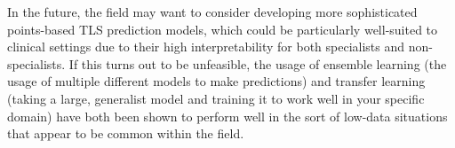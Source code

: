 \documentclass{article}
\begin{document}
In the future, the field may want to consider developing more sophisticated points-based TLS prediction models, which could be particularly well-suited to clinical settings due to their high interpretability for both specialists and non-specialists. If this turns out to be unfeasible, the usage of ensemble learning (the usage of multiple different models to make predictions) and transfer learning (taking a large, generalist model and training it to work well in your specific domain) have both been shown to perform well in the sort of low-data situations that appear to be common within the field.


\newpage
      

\end{document}
